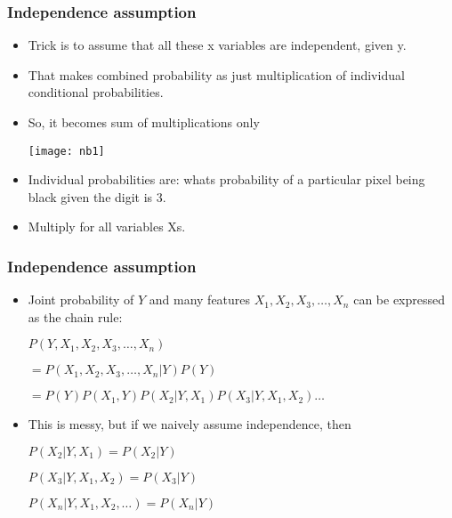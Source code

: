 
\begin{frame}[fragile]\frametitle{Independence assumption }
\begin{itemize}
\item Trick is to assume that all these x variables are independent, given y.
\item That makes combined probability as just multiplication of individual conditional probabilities.
\item So, it becomes sum of multiplications only
\begin{center}
\texttt{[image: nb1]}
\end{center}
\item Individual probabilities are: whats probability of a particular pixel being black given the digit is 3.
\item Multiply for all variables Xs.
\end{itemize}
\end{frame}

\begin{frame}[fragile]\frametitle{Independence assumption }
\begin{itemize}
\item Joint probability of $Y$ and many features $X_1,X_2,X_3,\ldots,X_n$ can be expressed as the chain rule:

$P(Y,X_1,X_2,X_3,\ldots,X_n)$

$= P(X_1,X_2,X_3,\ldots,X_n|Y)P(Y)$

$= P(Y)P(X_1,Y)P(X_2|Y,X_1)P(X_3|Y,X_1,X_2)\ldots$

\item This is messy, but if we naively assume independence, then

$P(X_2|Y,X_1) = P(X_2|Y)$

$P(X_3|Y,X_1,X_2) = P(X_3|Y)$

$P(X_n|Y,X_1,X_2,\ldots) = P(X_n|Y)$

\end{itemize}
\end{frame}



